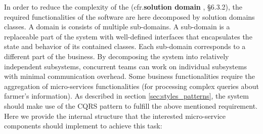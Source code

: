 


In order to reduce the complexity of the (cfr.\textbf{solution domain} \cite{bruegge2013object}, \S 6.3.2), the required functionalities of the software are here decomposed by solution domains classes. A domain is consists of multiple sub-domains. A sub-domain is a replaceable part of the system with well-defined interfaces that encapsulates the state and behavior of its contained classes. Each sub-domain corresponds to a different part of the business. By decomposing the system into relatively independent subsystems, concurrent teams can work on individual subsystems with minimal communication overhead. Some business functionalities require the aggregation of micro-services functionalities (\ie for processing complex queries about farmer's information). As described in section \ref{sec:styles_patterns}, the system should make use of the CQRS pattern to fulfill the above mentioned requirement. Here we provide the internal structure that the interested micro-service components should implement to achieve this task:


